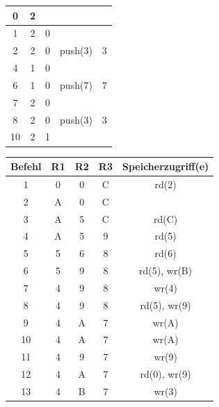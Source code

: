 \documentclass[a4paper, 12pt, margins=2cm]{homework}
\begin{document}
\begin{solution}
\begin{minipage}{0.5\textwidth}
\begin{tabular}{|c|c|c|c|c|}
        0       & 2 &   &                 &              \\ \hline
        1       & 2 & 0 &                 &              \\ \hline
        2       & 2 & 0 & push(3)         & 3            \\ \hline
        4       & 1 & 0 &                 &              \\ \hline
        6       & 1 & 0 & push(7)         & 7            \\ \hline
        7       & 2 & 0 &                 &              \\ \hline
        8       & 2 & 0 & push(3)         & 3            \\ \hline
        10      & 2 & 1 &                 &              \\ \hline
      \end{tabular}
    \end{minipage}
    
  \end{solution}

  \begin{problem}
  \end{problem}
  \begin{solution}\hfill
    
    \begin{center}
      \begin{tabular}{|c|c|c|c|c|}
        \hline
        Befehl & R1 & R2 & R3 & Speicherzugriff(e) \\ \hline
        1      & 0  & 0  & C  & rd(2)              \\ \hline
        2      & A  & 0  & C  &                    \\ \hline
        3      & A  & 5  & C  & rd(C)              \\ \hline
        4      & A  & 5  & 9  & rd(5)              \\ \hline
        5      & 5  & 6  & 8  & rd(6)              \\ \hline
        6      & 5  & 9  & 8  & rd(5), wr(B)       \\ \hline
        7      & 4  & 9  & 8  & wr(4)              \\ \hline
        8      & 4  & 9  & 8  & rd(5), wr(9)       \\ \hline
        9      & 4  & A  & 7  & wr(A)              \\ \hline
        10     & 4  & A  & 7  & wr(A)              \\ \hline
        11     & 4  & 9  & 7  & wr(9)              \\ \hline
        12     & 4  & A  & 7  & rd(0), wr(9)       \\ \hline
        13     & 4  & B  & 7  & wr(3)              \\ \hline
      \end{tabular}
    \end{center}
  \end{solution}
\end{document}
